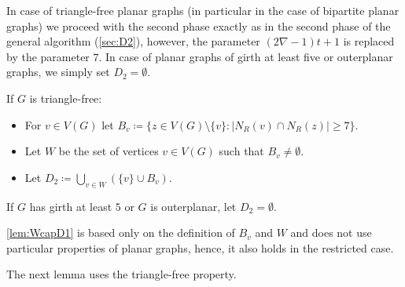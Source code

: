 In case of triangle-free planar graphs (in particular in the case of bipartite
planar graphs) we proceed with the second phase exactly as in the second phase of
the general algorithm (\cref{sec:D2}), however, the parameter $(2\nabla-1)t+1$ is replaced by
the parameter $7$. In  case of planar graphs of girth at least five or outerplanar
graphs, we simply set $D_2=\emptyset$.

\begin{tcolorbox}[colback=red!5!white,colframe=red!50!black]
  If $G$ is triangle-free:

  \begin{itemize}
    \item For $v\in V(G)$ let $B_v\coloneqq \{z\in V(G)\setminus
      \{v\}: |N_R(v)\cap N_R(z)|\geq 7\}$.\smallskip
    \item Let $W$ be the set of vertices $v\in V(G)$ such
      that $B_v \neq \emptyset$.\smallskip
    \item Let $D_2\coloneqq \bigcup\limits_{v\in W} (\{v\}\cup B_v)$.
  \end{itemize}

  If $G$ has girth at least $5$ or $G$ is outerplanar, let $D_2=\emptyset$.
\end{tcolorbox}

\cref{lem:WcapD1} is based only on the definition of $B_v$ and $W$ and
does not use particular properties of planar graphs, hence, it also holds
in the restricted case.

The next lemma uses the triangle-free property.

